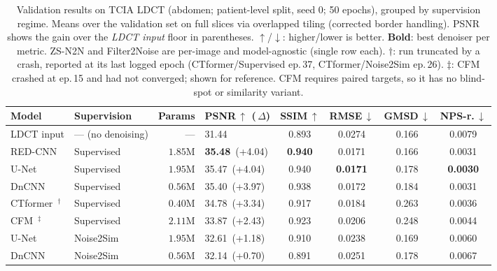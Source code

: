 \documentclass[10pt,twocolumn]{article}
\begin{document}
\begin{table}[t]
  \centering
  \small
  \caption{Validation results on TCIA LDCT (abdomen; patient-level split,
           seed 0; 50 epochs), grouped by supervision regime.  Means over
           the validation set on full slices via overlapped tiling
           (corrected border handling).  PSNR shows the gain over the
           \emph{LDCT input} floor in parentheses.  $\uparrow$/$\downarrow$:
           higher/lower is better.  \textbf{Bold}: best denoiser per metric.
           ZS-N2N and Filter2Noise are per-image and model-agnostic (single
           row each).  $\dagger$: run truncated by a crash, reported at its
           last logged epoch (CTformer/Supervised ep.\,37, CTformer/Noise2Sim
           ep.\,26).  $\ddagger$: CFM crashed at ep.\,15 and had not
           converged; shown for reference.  CFM requires paired targets, so
           it has no blind-spot or similarity variant.}
  \label{tab:results}
  \begin{tabular}{llrlcccc}
    \toprule
    \textbf{Model} & \textbf{Supervision} & \textbf{Params} &
    PSNR\,$\uparrow$ (\,$\Delta$) & SSIM\,$\uparrow$ & RMSE\,$\downarrow$ &
    GMSD\,$\downarrow$ & NPS-r.\,$\downarrow$ \\
    \midrule
    LDCT input & --- (no denoising) & --- & 31.44 & 0.893 & 0.0274 & 0.166 & 0.0079 \\
    \midrule
    RED-CNN~\cite{chen2017lowdose}   & Supervised & $1.85\mathrm{M}$ & \textbf{35.48} \,(+4.04) & \textbf{0.940} & 0.0171 & 0.166 & 0.0031 \\
    U-Net                            & Supervised & $1.95\mathrm{M}$ & 35.47 \,(+4.04) & 0.940 & \textbf{0.0171} & 0.178 & \textbf{0.0030} \\
    DnCNN~\cite{zhang2017beyond}     & Supervised & $0.56\mathrm{M}$ & 35.40 \,(+3.97) & 0.938 & 0.0172 & 0.184 & 0.0031 \\
    CTformer~\cite{wang2022ctformer}$^{\dagger}$ & Supervised & $0.40\mathrm{M}$ & 34.78 \,(+3.34) & 0.917 & 0.0184 & 0.263 & 0.0036 \\
    CFM~\cite{lipman2022flow}$^{\ddagger}$       & Supervised & $2.11\mathrm{M}$ & 33.87 \,(+2.43) & 0.923 & 0.0206 & 0.248 & 0.0044 \\
    \midrule
    U-Net                            & Noise2Sim~\cite{niu2020noise2sim} & $1.95\mathrm{M}$ & 32.61 \,(+1.18) & 0.910 & 0.0238 & 0.169 & 0.0060 \\
    DnCNN~\cite{zhang2017beyond}     & Noise2Sim~\cite{niu2020noise2sim} & $0.56\mathrm{M}$ & 32.14 \,(+0.70) & 0.891 & 0.0251 & 0.178 & 0.0067 \\

\end{tabular}
\end{table}
\end{document}
